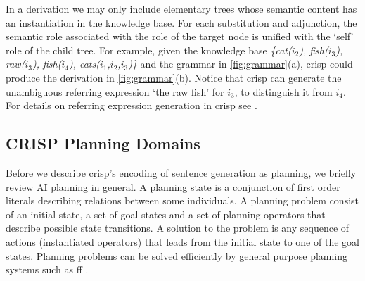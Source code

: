 In a derivation we may only include elementary trees whose semantic content has an instantiation in the knowledge base. For each substitution and adjunction, the semantic role associated with the role of the target node is unified with the `self' role of the child tree. For example, given the knowledge base 
{\it \{cat($i_2$), fish($i_3$), raw($i_3$), fish($i_4$), eats($i_1$,$i_2$,$i_3$)\}} and the grammar in \ref{fig:grammar}(a), {\sc crisp} could produce the derivation in \ref{fig:grammar}(b). Notice that {\sc crisp} can generate the unambiguous referring expression `the raw fish' for $i_3$, to distinguish it from $i_4$. For details on  referring expression generation in {\sc crisp} see .


\subsection{CRISP Planning Domains} 
\label{ssec:crispdomain}
Before we describe {\sc crisp}'s encoding of sentence generation as planning, we briefly review AI planning in general. 
A planning state is a conjunction of first order literals describing relations between some individuals. A planning problem consist of an initial state, a set of goal states and a set of planning operators that describe possible state transitions.  A solution to the problem is any sequence of actions (instantiated operators) that leads from the initial state to one of the goal states. Planning problems can be solved efficiently by general purpose planning systems such as 
{\sc ff} \cite{hoffmannnebel2001}.  
     

